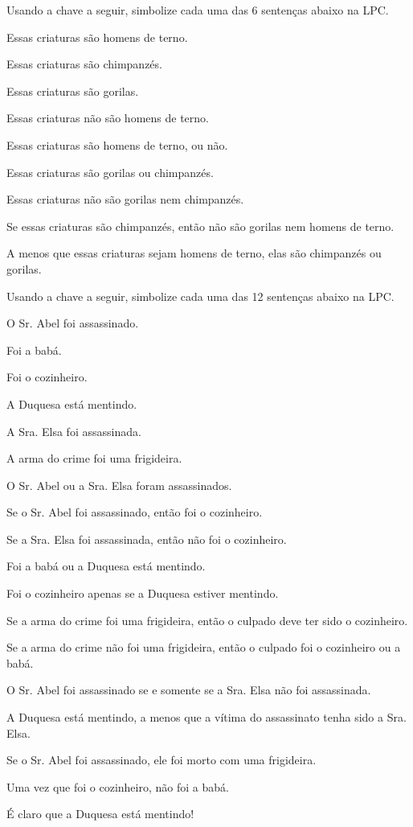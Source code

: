 \practiceproblems
\solutions
\problempart Usando a chave a seguir, simbolize cada uma das 6 sentenças abaixo na LPC.\label{pr.monkeysuits}
	\begin{ekey}
		\item[H] Essas criaturas são homens de terno. 
		\item[C] Essas criaturas são chimpanzés.
		\item[G] Essas criaturas são gorilas.
	\end{ekey}
\begin{earg}
	\item Essas criaturas não são homens de terno.
	\item Essas criaturas são homens de terno, ou não.
	\item Essas criaturas são gorilas ou chimpanzés.
	\item Essas criaturas não são gorilas nem chimpanzés.
	\item Se essas criaturas são chimpanzés, então não são gorilas nem homens de terno.
	\item A menos que essas criaturas sejam homens de terno, elas são chimpanzés ou gorilas.
\end{earg}

\problempart Usando a chave a seguir, simbolize cada uma das 12 sentenças abaixo na LPC.
\begin{ekey}
	\item[A] O Sr. Abel foi assassinado.
	\item[B] Foi a babá.
	\item[C] Foi o cozinheiro.
	\item[D] A Duquesa está mentindo.
	\item[E] A Sra. Elsa foi assassinada.
	\item[F] A arma do crime foi uma frigideira.
\end{ekey}
\begin{earg}
	\item O Sr. Abel ou a Sra. Elsa foram assassinados.
	\item Se o Sr. Abel foi assassinado, então foi o cozinheiro.
	\item Se a Sra. Elsa foi assassinada, então não foi o cozinheiro.
	\item Foi a babá ou a Duquesa está mentindo.
	\item Foi o cozinheiro apenas se a Duquesa estiver mentindo.
	\item Se a arma do crime foi uma frigideira, então o culpado deve ter sido o cozinheiro.
	\item Se a arma do crime não foi uma frigideira, então o culpado foi o cozinheiro ou a babá.
	\item O Sr. Abel foi assassinado se e somente se a Sra. Elsa não foi assassinada.
	\item A Duquesa está mentindo, a menos que a vítima do assassinato tenha sido a Sra. Elsa.
	\item Se o Sr. Abel foi assassinado, ele foi morto com uma frigideira.
	\item Uma vez que foi o cozinheiro, não foi a babá.
	\item É claro que a Duquesa está mentindo!
\end{earg}
\solutions

